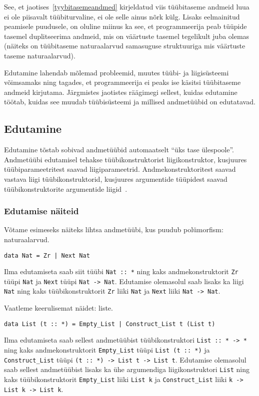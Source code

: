 \documentclass[12pt]{article}
\begin{document}
      See, et jaotises~\ref{tyybitasemeandmed} kirjeldatud viis tüübitaseme andmeid luua ei ole piisavalt tüübiturvaline, ei ole selle ainus nõrk külg. Lisaks eelmainitud peamisele puudusele, on oluline miinus ka see, et programmeerija peab tüüpide tasemel duplitseerima andmeid, mis on väärtuste tasemel tegelikult juba olemas (näiteks on tüübitaseme naturaalarvud samasuguse struktuuriga mis väärtuste taseme naturaalarvud).

      Edutamine lahendab mõlemad probleemid, muutes tüübi- ja liigisüsteemi võimsamaks ning tagades, et programmeerija ei peaks ise käsitsi tüübitaseme andmeid kirjutama. Järgmistes jaotistes räägimegi sellest, kuidas edutamine töötab, kuidas see muudab tüübisüsteemi ja millised andmetüübid on edutatavad.
    \subsection{Edutamine}
      Edutamine tõstab sobivad andmetüübid automaatselt "`üks tase ülespoole"'. Andmetüübi edutamisel tehakse tüübikonstruktorist liigikonstruktor, kusjuures tüübiparameetritest saavad liigiparameetrid. Andmekonstruktoritest saavad vastava liigi tüübikonstruktorid, kusjuures argumentide tüüpidest saavad tüübikonstruktorite argumentide liigid~\cite{Giv}.
      \subsubsection{Edutamise näiteid}
        Võtame esimeseks näiteks lihtsa andmetüübi, kus puudub polümorfism: naturaalarvud.

        \begin{verbatim}data Nat = Zr | Next Nat\end{verbatim}

        Ilma edutamiseta saab siit tüübi \verb!Nat :: *! ning kaks andmekonstruktorit \verb!Zr! tüüpi \verb!Nat! ja \verb!Next! tüüpi \verb!Nat -> Nat!. Edutamise olemasolul saab lisaks ka liigi \verb!Nat! ning kaks tüübikonstruktorit \verb!Zr! liiki \verb!Nat! ja \verb!Next! liiki \verb!Nat -> Nat!.

        Vaatleme keerulisemat näidet: liste.

        \begin{verbatim}data List (t :: *) = Empty_List | Construct_List t (List t)\end{verbatim}

        Ilma edutamiseta saab sellest andmetüübist tüübikonstruktori \verb!List :: * -> *! ning kaks andmekonstruktorit \verb!Empty_List! tüüpi \verb!List (t :: *)! ja \verb!Construct_List! tüüpi \verb!(t :: *) -> List t -> List t!. Edutamise olemasolul saab sellest andmetüübist lisaks ka ühe argumendiga liigikonstruktori \verb!List! ning kaks tüübikonstruktorit \verb!Empty_List! liiki \verb!List k! ja \verb!Construct_List! liiki \verb!k -> List k -> List k!.
\end{document}

